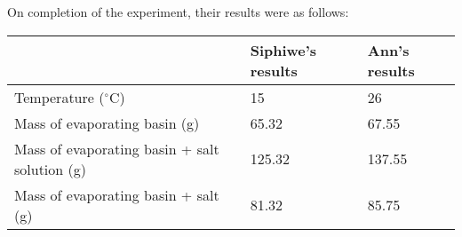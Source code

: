 {\begin{enumerate}

% 
 On completion of the experiment, their results were as follows:

\begin{tabular}{|l|p{1.8cm}|p{1.8cm}|}\hline
& Siphiwe's results & Ann's results \\\hline
Temperature ($^{\circ}$C) & 15 & 26 \\\hline
Mass of evaporating basin (g) & 65.32 & 67.55 \\\hline
Mass of evaporating basin + salt solution (g) & 125.32 & 137.55 \\\hline
Mass of evaporating basin + salt (g) & 81.32 & 85.75 \\\hline
\end{tabular}


\end{enumerate}}
